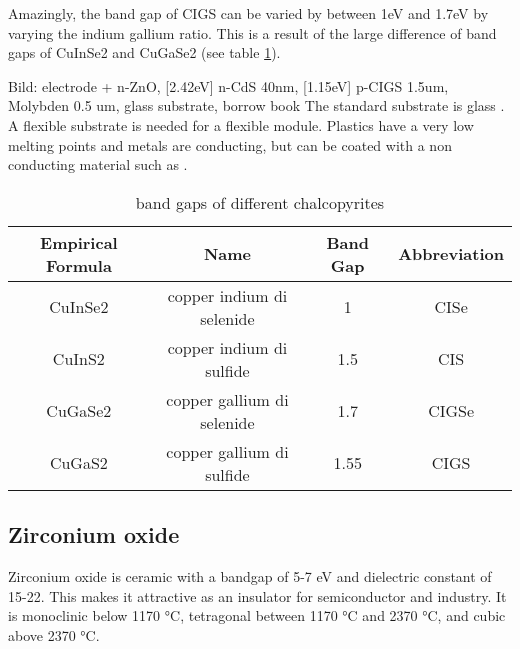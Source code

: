 Amazingly, the band gap of CIGS can be varied by between 1eV and 1.7eV by varying the indium gallium ratio.
This is a result of the large difference of band gaps of CuInSe2 and CuGaSe2 (see table \ref{tab:cigs}). 

{Bild: electrode + n-ZnO, [2.42eV] n-CdS 40nm, [1.15eV] p-CIGS 1.5um, Molybden 0.5 um, glass substrate, borrow book} 
The standard substrate is glass . A flexible substrate is needed for a flexible module. 
Plastics have a very low melting points and metals are conducting, but can be coated with a non conducting material such as .
\begin{table}[htb]
    \center
    \begin{tabular}{cccc}
        \hline\hline
        Empirical Formula&    Name&   Band Gap&    Abbreviation\\
        \hline
        CuInSe2&       copper indium di selenide&  1&  CISe\\
        CuInS2&        copper indium di sulfide&  1.5&  CIS\\
        CuGaSe2&       copper gallium di selenide&  1.7&  CIGSe\\
        CuGaS2&        copper gallium di sulfide&  1.55&  CIGS\\
        \hline\hline
    \end{tabular}
	\caption{band gaps of different chalcopyrites}
	\label{tab:cigs}
\end{table}




\subsection{Zirconium oxide}
Zirconium oxide  is ceramic with a bandgap of 5-7 eV and dielectric constant of 15-22\cite{Anwar2017}. 
This makes it attractive as an insulator for semiconductor and  industry. 
It is monoclinic below 1170 °C, tetragonal between 1170 °C and 2370 °C, and cubic above 2370 °C\cite{Stevens1986}.

